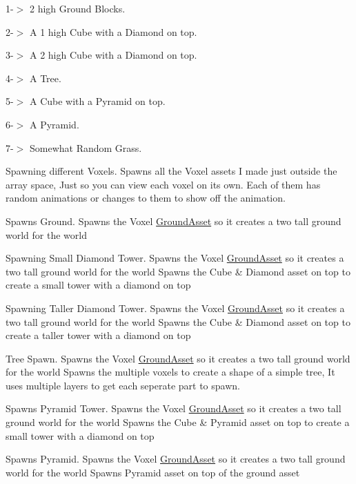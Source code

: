 1-\/$>$ 2 high Ground Blocks.

2-\/$>$ A 1 high Cube with a Diamond on top.

3-\/$>$ A 2 high Cube with a Diamond on top.

4-\/$>$ A Tree.

5-\/$>$ A Cube with a Pyramid on top.

6-\/$>$ A Pyramid.

7-\/$>$ Somewhat Random Grass.

Spawning different Voxels. Spawns all the Voxel assets I made just outside the array space, Just so you can view each voxel on it\textquotesingle{}s own. Each of them has random animations or changes to them to show off the animation.

Spawns Ground. Spawns the Voxel \hyperlink{class_ground_asset}{Ground\+Asset} so it creates a two tall ground world for the world

Spawning Small Diamond Tower. Spawns the Voxel \hyperlink{class_ground_asset}{Ground\+Asset} so it creates a two tall ground world for the world Spawns the Cube \& Diamond asset on top to create a small tower with a diamond on top

Spawning Taller Diamond Tower. Spawns the Voxel \hyperlink{class_ground_asset}{Ground\+Asset} so it creates a two tall ground world for the world Spawns the Cube \& Diamond asset on top to create a taller tower with a diamond on top

Tree Spawn. Spawns the Voxel \hyperlink{class_ground_asset}{Ground\+Asset} so it creates a two tall ground world for the world Spawns the multiple voxels to create a shape of a simple tree, It uses multiple layers to get each seperate part to spawn.

Spawns Pyramid Tower. Spawns the Voxel \hyperlink{class_ground_asset}{Ground\+Asset} so it creates a two tall ground world for the world Spawns the Cube \& Pyramid asset on top to create a small tower with a diamond on top

Spawns Pyramid. Spawns the Voxel \hyperlink{class_ground_asset}{Ground\+Asset} so it creates a two tall ground world for the world Spawns Pyramid asset on top of the ground asset


